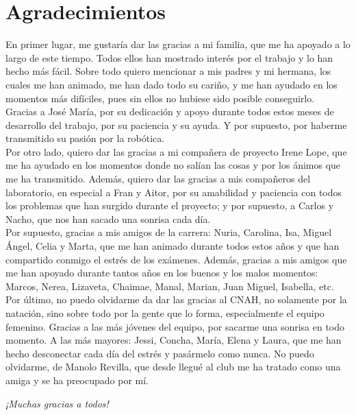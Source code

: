 \chapter*{Agradecimientos}
En primer lugar, me gustaría dar las gracias a mi familia, que me ha apoyado a lo largo de este tiempo. Todos ellos han mostrado interés por el trabajo y lo han hecho más fácil. Sobre todo quiero mencionar a mis padres y mi hermana, los cuales me han animado, me han dado todo su cariño, y me han ayudado en los momentos más difíciles, pues sin ellos no hubiese sido posible conseguirlo.\\

Gracias a José María, por su dedicación y apoyo durante todos estos meses de desarrollo del trabajo, por su paciencia y su ayuda. Y por supuesto, por haberme transmitido su pasión por la robótica.\\

Por otro lado, quiero  dar las gracias a mi compañera de proyecto Irene Lope, que me ha ayudado en los momentos donde no salían las cosas y por los ánimos que me ha transmitido. Además, quiero dar las gracias a mis compañeros del laboratorio, en especial a Fran y Aitor, por su amabilidad y paciencia con todos los problemas que han surgido durante el proyecto; y por supuesto, a Carlos y Nacho, que nos han sacado una sonrisa cada día.\\

Por supuesto, gracias a mis amigos de la carrera: Nuria, Carolina, Isa, Miguel Ángel, Celia y Marta, 	que me han animado durante todos estos años y que han compartido conmigo el estrés de los exámenes. Además, gracias a mis amigos que me han apoyado durante tantos años en los buenos y los malos momentos: Marcos, Nerea, Lizaveta, Chaimae, Manal, Marian, Juan Miguel, Isabella, etc.\\

Por último, no puedo olvidarme da dar las gracias al CNAH, no solamente por la natación, sino sobre todo por la gente que lo forma, especialmente el equipo femenino. Gracias a las más jóvenes del equipo, por sacarme una sonrisa en todo momento. A las más mayores: Jessi, Concha, María, Elena y Laura, que me han hecho desconectar cada día del estrés y pasármelo como nunca. No puedo olvidarme, de Manolo Revilla, que desde llegué al club me ha tratado como una amiga y se ha preocupado por mí.

\begin{flushright}
	\emph{¡Muchas gracias a todos!}
\end{flushright}